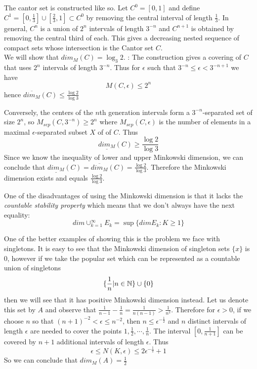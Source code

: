 \documentclass{article}
\begin{document}
\begin{example}
The cantor set is constructed like so. Let $C^0=[0,1]$ and define $C^1=[0,\frac{1}{3}]\cup[\frac{2}{3},1]\subset C^0$ by removing the central interval of length $\frac{1}{3}$. In general, $C^n$ is a union of $2^n$ intervals of length $3^{-n}$ and $C^{n+1}$ is obtained by removing the central third of each. This gives a decreasing nested sequence of compact sets whose intersection is the Cantor set $C$. \\
We will show that $dim_M(C)=\log_3{2}$.
\proof:
The construction gives a covering of $C$ that uses $2^n$ intervals of length $3^{-n}$. Thus for $\epsilon$ such that $3^{-n}\leq\epsilon<3^{-n+1}$ we have $$M(C,\epsilon)\leq2^n$$
hence $\overline{dim_M}(C)\leq \frac{\log{2}}{\log{3}}$

Conversely, the centers of the $n$th generation intervals form a $3^{-n}$-separated set of size $2^n$, so $M_{sep}(C,3^{-n})\geq 2^n$ where $M_{sep}(C,\epsilon)$ is the number of elements in a maximal $\epsilon$-separated subset $X$ of of $C$. Thus
$$\underline{dim_M}(C)\geq  \frac{\log{2}}{\log{3}}$$
Since we know the inequality of lower and upper Minkowski dimension, we can conclude that $\underline{dim_M}(C)=\overline{dim_M}(C)=\frac{\log{2}}{\log{3}}$.
Therefore the Minkowski dimension exists and equals $\frac{\log{2}}{\log{3}}$.
\end{example} 

One of the disadvantages of using the Minkowski dimension is that it lacks the \textit{countable stability property} which means that we don't always have the next equality:
$$dim\cup_{k=1}^{\infty}E_k = \sup\{dim E_k:K\geq 1\} $$
\begin{example}
One of the better examples of showing this is the problem we face with singletons. It is easy to see that the Minkowski dimension of singleton sets $\{x\}$ is 0, however if we take the popular set which can be represented as a countable union of singletons $$\{\frac{1}{n}|n\in \mathbb{N}\}\cup \{0\} $$
then we will see that it has positive Minkowski dimension instead.\cite{bishop_peres_2016}
\proof 
Let us denote this set by $A$ and observe that $\frac{1}{n-1}-\frac{1}{n}=\frac{1}{n(n-1)}>\frac{1}{n^2}$. Therefore for $\epsilon>0$, if we choose $n$ so that $(n+1)^{-2}<\epsilon\leq n^{-2}$, then $n\leq\epsilon^{-\frac{1}{2}}$ and $n$ distinct intervals of length $\epsilon$ are needed to cover the points $1,\frac{1}{2},\cdots,\frac{1}{n}$. The interval $[0,\frac{1}{n+1}]$ can be covered by $n+1$ additional intervals of length $\epsilon$. Thus 
$$\epsilon\leq N(K,\epsilon)\leq 2\epsilon^{-\frac{1}{2}}+1$$
So we can conclude that $dim_M(A)=\frac{1}{2}$
\end{example}
\end{document}
